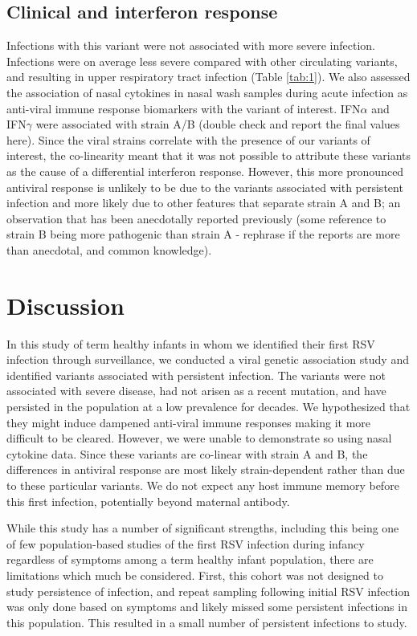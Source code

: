 \documentclass{article}
\begin{document}
\subsection{Clinical and interferon response}
Infections with this variant were not associated with more severe infection. Infections were on average less severe compared with other circulating variants, and resulting in upper respiratory tract infection (Table \ref{tab:1}). 
We also assessed the association of nasal cytokines in nasal wash samples during acute infection as anti-viral immune response biomarkers with the variant of interest.
IFN$\alpha$ and IFN$\gamma$ were associated with strain A/B
(double check and report the final values here). 
Since the viral strains correlate with the presence of our variants of interest, the co-linearity meant that it was not possible to attribute these variants as the cause of a differential interferon response.
However, this more pronounced antiviral response is unlikely to be due to the variants associated with persistent infection and more likely due to other features that separate strain A and B; an observation that has been anecdotally reported previously 
(some reference to strain B being more pathogenic than strain A - rephrase if the reports are more than anecdotal, and common knowledge). 

\section{Discussion}
In this study of term healthy infants in whom we identified their first RSV infection through surveillance, we conducted a viral genetic association study and identified variants associated with persistent infection. 
The variants were not associated with severe disease, had not arisen as a recent mutation, and have persisted in the population at a low prevalence for decades.
We hypothesized that they might induce dampened anti-viral immune responses making it more difficult to be cleared. 
However, we were unable to demonstrate so using nasal cytokine data.
Since these variants are co-linear with strain A and B, the differences in antiviral response are most likely strain-dependent rather than due to these particular variants.
We do not expect any host immune memory before this first infection, potentially beyond maternal antibody.

While this study has a number of significant strengths, including this being one of few population-based studies of the first RSV infection during infancy regardless of symptoms among a term healthy infant population, there are limitations which much be considered.
First, this cohort was not designed to study persistence of infection, and repeat sampling following initial RSV infection was only done based on symptoms and likely missed some persistent infections in this population. 
This resulted in a small number of persistent infections to study.
\end{document}
